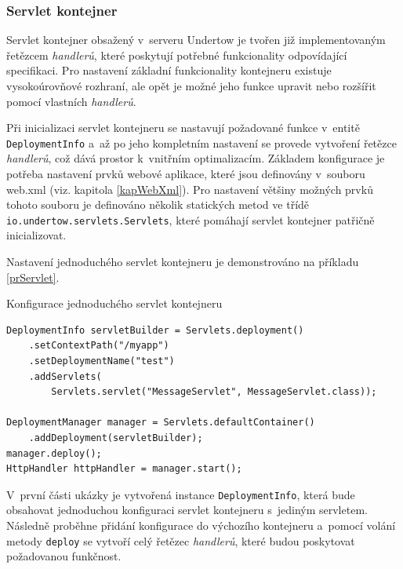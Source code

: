             \subsubsection{Servlet kontejner}
                Servlet kontejner obsažený v~serveru Undertow je tvořen již implementovaným
                řetězcem \emph{handlerů}, které poskytují potřebné funkcionality odpovídající specifikaci.
                Pro nastavení základní funkcionality kontejneru existuje vysokoúrovňové rozhraní,
                ale opět je možné jeho funkce upravit nebo rozšířit pomocí vlastních \emph{handlerů}. 

                Při inicializaci servlet kontejneru se nastavují požadované funkce v~entitě \texttt{DeploymentInfo}
                a~až po jeho kompletním nastavení se provede vytvoření řetězce \emph{handlerů}, což
                dává prostor k~vnitřním optimalizacím. 
                Základem konfigurace je potřeba nastavení prvků webové aplikace, které jsou definovány v~souboru web.xml (viz. kapitola \ref{kapWebXml}).
                Pro nastavení většiny možných prvků tohoto souboru je
                definováno několik statických metod ve třídě \\\texttt{io.undertow.servlets.Servlets}, které    
                pomáhají servlet kontejner patřičně inicializovat.

                Nastavení jednoduchého servlet kontejneru je demonstrováno na příkladu \ref{prServlet}.

\begin{priklad} \label{prServlet} Konfigurace jednoduchého servlet kontejneru
\begin{verbatim}
DeploymentInfo servletBuilder = Servlets.deployment()
    .setContextPath("/myapp")
    .setDeploymentName("test")
    .addServlets(
        Servlets.servlet("MessageServlet", MessageServlet.class));

DeploymentManager manager = Servlets.defaultContainer()
    .addDeployment(servletBuilder);
manager.deploy();
HttpHandler httpHandler = manager.start();
\end{verbatim}
\end{priklad}
                V~první části ukázky je vytvořená instance \texttt{DeploymentInfo}, která bude obsahovat jednoduchou konfiguraci
                servlet kontejneru s~jediným servletem. Následně proběhne přidání konfigurace do výchozího kontejneru 
                a~pomocí volání metody \texttt{deploy}
                se vytvoří celý řetězec \emph{handlerů}, které budou poskytovat požadovanou funkčnost.
                
